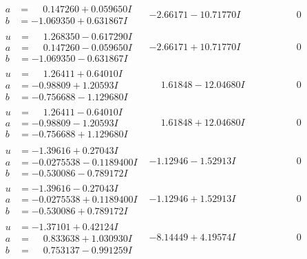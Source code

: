 \documentclass[1p]{elsarticle_modified}
\theoremstyle{definition}
\begin{document}
$$\begin{array}{c|c|c}
\begin{aligned}
a &= \phantom{-}0.147260 + 0.059650 I \\
b &= -1.069350 + 0.631867 I\end{aligned}
 & -2.66171 - 10.71770 I & \phantom{-0.000000 } 0 \\ \hline\begin{aligned}
u &= \phantom{-}1.268350 - 0.617290 I \\
a &= \phantom{-}0.147260 - 0.059650 I \\
b &= -1.069350 - 0.631867 I\end{aligned}
 & -2.66171 + 10.71770 I & \phantom{-0.000000 } 0 \\ \hline\begin{aligned}
u &= \phantom{-}1.26411 + 0.64010 I \\
a &= -0.98809 + 1.20593 I \\
b &= -0.756688 - 1.129680 I\end{aligned}
 & \phantom{-}1.61848 - 12.04680 I & \phantom{-0.000000 } 0 \\ \hline\begin{aligned}
u &= \phantom{-}1.26411 - 0.64010 I \\
a &= -0.98809 - 1.20593 I \\
b &= -0.756688 + 1.129680 I\end{aligned}
 & \phantom{-}1.61848 + 12.04680 I & \phantom{-0.000000 } 0 \\ \hline\begin{aligned}
u &= -1.39616 + 0.27043 I \\
a &= -0.0275538 - 0.1189400 I \\
b &= -0.530086 - 0.789172 I\end{aligned}
 & -1.12946 - 1.52913 I & \phantom{-0.000000 } 0 \\ \hline\begin{aligned}
u &= -1.39616 - 0.27043 I \\
a &= -0.0275538 + 0.1189400 I \\
b &= -0.530086 + 0.789172 I\end{aligned}
 & -1.12946 + 1.52913 I & \phantom{-0.000000 } 0 \\ \hline\begin{aligned}
u &= -1.37101 + 0.42124 I \\
a &= \phantom{-}0.833638 + 1.030930 I \\
b &= \phantom{-}0.753137 - 0.991259 I\end{aligned}
 & -8.14449 + 4.19574 I & \phantom{-0.000000 } 0 \\ \hline\begin{aligned}

\end{aligned}
\end{array}$$
\end{document}
